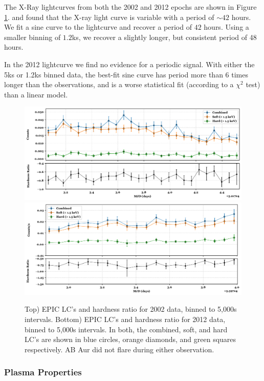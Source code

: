 \documentclass[twocolumn]{aastex631}
\begin{document}
The X-Ray lightcurves from both the 2002 and 2012 epochs are shown in Figure \ref{fig:ab_aur_lc}. 
\citet{stelzer_statistical_2007} and \citet{telleschi_first_2007} found that the X-ray light curve is variable with a period of $\sim42$ hours. We fit a sine curve to the lightcurve and recover a period of $42$ hours. Using a smaller binning of $1.2$ks, we recover a slightly longer, but consistent period of 48 hours.

In the 2012 lightcurve we find no evidence for a periodic signal. With either the 5ks or 1.2ks binned data, the best-fit sine curve has period more than $6$ times longer than the observations, and is a worse statistical fit (according to a $\chi^2$ test) than a linear model.

\begin{figure}
    \centering
    \includegraphics[width=0.85\linewidth]{Figures/AB Aur/figure_2002_lc_5000.pdf}
    \includegraphics[width=0.85\linewidth]{Figures/AB Aur/figure_2012_lc_5000.pdf}
    \caption{Top) EPIC LC's and hardness ratio for 2002 data, binned to 5,000s intervals. Bottom) EPIC LC's and hardness ratio for 2012 data, binned to 5,000s intervals. In both, the combined, soft, and hard LC's are shown in blue circles, orange diamonds, and green squares respectively. AB Aur did not flare during either observation.}
    \label{fig:ab_aur_lc}
\end{figure}

\subsubsection{Plasma Properties}
\end{document}

